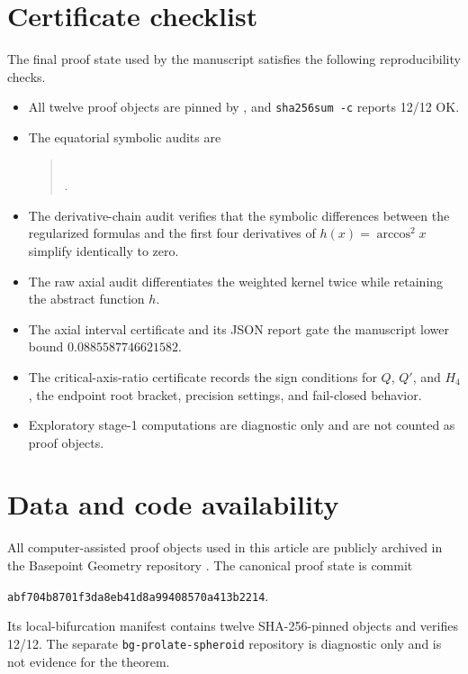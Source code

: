 \documentclass[11pt]{article}
\begin{document}
\section{Certificate checklist}
The final proof state used by the manuscript satisfies the following reproducibility checks.
\begin{itemize}
\item All twelve proof objects are pinned by , and \texttt{sha256sum -c} reports 12/12 OK.
\item The equatorial symbolic audits are
\begin{quote}\small
{}\\
.
\end{quote}
\item The derivative-chain audit  verifies that the symbolic differences between the regularized formulas and the first four derivatives of $h(x)=\arccos^2x$ simplify identically to zero.
\item The raw axial audit  differentiates the weighted kernel twice while retaining the abstract function $h$.
\item The axial interval certificate  and its JSON report gate the manuscript lower bound $0.0885587746621582$.
\item The critical-axis-ratio certificate records the sign conditions for $Q$, $Q'$, and $H_4$, the endpoint root bracket, precision settings, and fail-closed behavior.
\item Exploratory stage-1 computations are diagnostic only and are not counted as proof objects.
\end{itemize}

\section*{Data and code availability}
All computer-assisted proof objects used in this article are publicly archived in the Basepoint Geometry repository \cite{Repo}. The canonical proof state is commit
\begin{center}
\texttt{abf704b8701f3da8eb41d8a99408570a413b2214}.
\end{center}
Its local-bifurcation manifest contains twelve SHA-256-pinned objects and verifies 12/12. The separate \texttt{bg-prolate-spheroid} repository is diagnostic only and is not evidence for the theorem.
\end{document}
